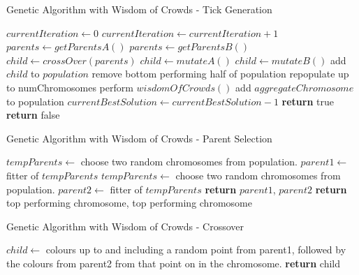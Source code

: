 \begin{algorithm}
\caption{Genetic Algorithm with Wisdom of Crowds - Tick Generation}
	\begin{algorithmic}[1]
    		 
    			\State $currentIteration \gets 0$
    				\State $currentIteration \gets currentIteration + 1$
    					\State $parents \gets getParentsA()$
    				\Else
    					\State $parents \gets getParentsB()$
    				\EndIf
    				\State $child \gets crossOver(parents)$
    						\State $child \gets mutateA()$
    					\Else
    						\State $child \gets mutateB()$
    					\EndIf
    				\EndIf
    				\State add $child$ to $population$
    				\State remove bottom performing half of population
    				\State repopulate up to numChromosomes
    			\EndWhile
    				\State perform $wisdomOfCrowds()$ 
    				\State add $aggregateChromosome$ to population
    			\EndIf
    				\State $currentBestSolution \gets currentBestSolution -1$
    				\State \textbf{return} true
    			\Else
    				\State \textbf{return} false
    			\EndIf
   		\EndProcedure
    \end{algorithmic} 
\end{algorithm}

\begin{algorithm}
\begin{algorithmic}[1]
\caption{Genetic Algorithm with Wisdom of Crowds - Parent Selection}
		\State $tempParents \gets$ choose two random chromosomes from population.
		\State $parent1 \gets$ fitter of $tempParents$
		\State $tempParents \gets$ choose two random chromosomes from population.
		\State $parent2 \gets$ fitter of $tempParents$
		\State \textbf{return} $parent1$, $parent2$
	\EndProcedure
	\linebreak
	\setcounter{ALG@line}{0}
		\State \textbf{return} top performing chromosome, top performing chromosome
	\EndProcedure
\end{algorithmic}
\end{algorithm}


\begin{algorithm}
\begin{algorithmic}[1]
\caption{Genetic Algorithm with Wisdom of Crowds - Crossover}
		\State $child \gets$ colours up to and including a random point from parent1, followed by the colours from parent2 from that point on in the chromosome.
		\State \textbf{return} child
	\EndProcedure
\end{algorithmic}
\end{algorithm}

